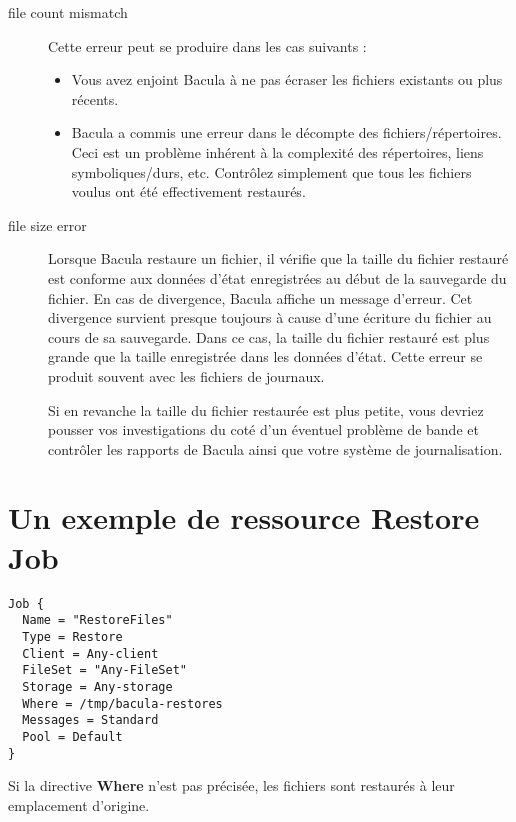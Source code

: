 \begin{description}

\item [file count mismatch]
   Cette erreur peut se produire dans les cas suivants : 
   \begin{itemize}
   \item Vous avez enjoint Bacula \`a ne pas \'ecraser les fichiers 
      existants ou plus r\'ecents.
   \item Bacula a commis une erreur dans le d\'ecompte des fichiers/r\'epertoires. 
      Ceci est un probl\`eme inh\'erent \`a la complexit\'e des r\'epertoires, liens 
      symboliques/durs, etc. Contr\^olez simplement que tous les fichiers voulus ont \'et\'e 
      effectivement restaur\'es.
   \end{itemize}
\item [file size error]
   Lorsque Bacula restaure un fichier, il v\'erifie que la taille du fichier 
   restaur\'e est conforme aux donn\'ees d'\'etat enregistr\'ees au d\'ebut de la sauvegarde 
   du fichier. En cas de divergence, Bacula affiche un message d'erreur. Cet 
   divergence survient presque toujours \`a cause d'une \'ecriture du fichier 
   au cours de sa sauvegarde. Dans ce cas, la taille du fichier restaur\'e 
   est plus grande que la taille enregistr\'ee dans les donn\'ees d'\'etat. Cette 
   erreur se produit souvent avec les fichiers de journaux.

   Si en revanche la taille du fichier restaur\'ee est plus petite, vous devriez 
   pousser vos investigations du cot\'e d'un \'eventuel probl\`eme de bande et 
   contr\^oler les rapports de Bacula ainsi que votre syst\`eme de journalisation.
\end{description}

\section{Un exemple de ressource Restore Job}

\footnotesize
\begin{verbatim}
Job {
  Name = "RestoreFiles"
  Type = Restore
  Client = Any-client
  FileSet = "Any-FileSet"
  Storage = Any-storage
  Where = /tmp/bacula-restores
  Messages = Standard
  Pool = Default
}
\end{verbatim}
\normalsize
Si la directive {\bf Where} n'est pas pr\'ecis\'ee, les fichiers sont restaur\'es \`a 
leur emplacement d'origine. 
\label{Selection}

